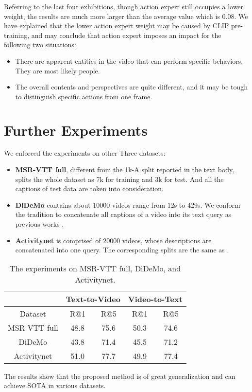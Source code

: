 \documentclass[letterpaper]{article} \usepackage{aaai22}  \usepackage{times}  \usepackage{helvet}  \usepackage{courier}  \usepackage[hyphens]{url}  \usepackage{graphicx} \urlstyle{rm} \def\UrlFont{\rm}  \usepackage{natbib}  \usepackage{caption}
\begin{document}
Referring to the last four exhibitions, though action expert still occupies a lower weight, the results are much more larger than the average value which is 0.08. We have explained that the lower action expert weight may be caused by CLIP pre-training, and may conclude that action expert imposes an impact for the following two situations:
\begin{itemize}
    \item  There are apparent entities in the video that can perform specific behaviors. They are most likely people.
    \item The overall contents and perspectives are quite different, and it may be tough to distinguish specific actions from one frame.
\end{itemize}

\section{Further Experiments}
We enforced the experiments on other Three datasets:
\begin{itemize}
    \item \textbf{MSR-VTT full}, different from the 1k-A split reported in the text body, splits the whole dataset as 7k for training and 3k for test. And all the captions of test data are token into consideration.
    \item \textbf{DiDeMo}\cite{anne2017localizing} contains about 10000 videos range from 12s to 429s. We conform the tradition to concatenate all captions of a video into its text query as previous works \cite{luo2021clip4clip,Liu2019a}.
    \item \textbf{Activitynet}\cite{caba2015activitynet} is comprised of 20000 videos, whose descriptions are concatenated into one query. The corresponding splits are the same as \cite{luo2021clip4clip,Liu2019a}.
\end{itemize}

\begin{table}[h]
\centering
\caption{The experiments on MSR-VTT full, DiDeMo, and Activitynet.}
\label{extra_experiment}
\begin{tabular}{c|c|c|c|c}
\hline
&\multicolumn{2}{c|}{Text-to-Video} & \multicolumn{2}{c}{Video-to-Text} \\
\hline
Dataset &R@1  &R@5 &R@1 &R@5 \\
\hline
MSR-VTT full &48.8 &75.6 &50.3 &74.6 \\
DiDeMo &43.8 &71.4 &45.5 &71.2 \\
Activitynet &51.0 &77.7 &49.9 &77.4 \\
\hline
\end{tabular}
\end{table}
The results show that the proposed method is of great generalization and can achieve SOTA in various datasets.
\end{document}
